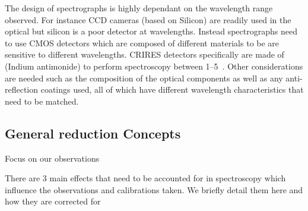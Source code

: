 The design of spectrographs is highly dependant on the wavelength range observed. For instance {CCD} cameras (based on Silicon) are readily used in the optical but silicon is a poor detector at \nir{} wavelengths.
Instead \nir{} spectrographs need to use CMOS detectors which are composed of different materials to be are sensitive to different wavelengths.
{CRIRES} detectors specifically are made of  (Indium antimonide) to perform spectroscopy between 1--5\um{}~\cite{dorn_crires_2004}.
Other considerations are needed such as the composition of the optical components as well as any anti-reflection coatings used, all of which have different wavelength characteristics that need to be matched.


\subsection{General reduction Concepts}
\label{subsec:nirreduction}

Focus on our observations\todo{}

There are 3 main effects that need to be accounted for in \nir{} spectroscopy which influence the observations and calibrations taken.
We briefly detail them here and how they are corrected for

